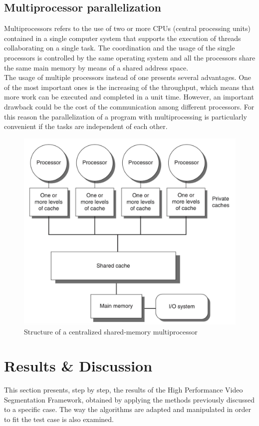 \documentclass{usiinftr}
\begin{document}



\subsection{Multiprocessor parallelization}
Multiprocessors refers to the use of two or more CPUs (central processing units) contained in a single computer system that supports the execution of threads collaborating on a single task. The coordination and the usage of the single processors is controlled by the same operating system and all the processors share the same main memory by means of a shared address space.  \\
The usage of multiple processors instead of one presents several advantages. One of the most important ones is the increasing of the  throughput, which means that more work can be executed and completed in a unit time. However, an important drawback could be the cost of the communication among different processors. For this reason the parallelization of a program with multiprocessing is particularly convenient if the tasks are independent of each other.

\begin{figure}[h]
	\centering
	\includegraphics[width=0.5\linewidth]{img/multiprocessing}
	\caption{Structure of a centralized shared-memory multiprocessor \cite{14}}
	\label{fig:3}
\end{figure}



\section{Results \& Discussion}
This section presents, step by step, the results of the High Performance Video Segmentation Framework, obtained by applying the methods previously discussed to a specific case. The way the algorithms are adapted and manipulated in order to fit the test case is also examined. 
\end{document}
